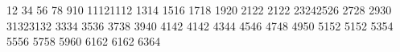12 34 56 78 910 11121112 1314 1516 1718 1920 2122 2122 23242526 2728 2930 31323132 3334 3536 3738 3940 4142 4142 4344 4546 4748 4950 5152 5152 5354 5556 5758 5960 6162 6162 6364